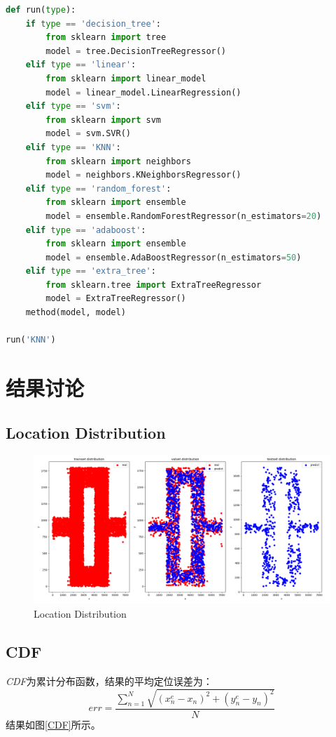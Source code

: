 \documentclass[UTF-8, a4paper, 10pt]{article}
\numberwithin{equation}{section}
\begin{document}
\begin{lstlisting}[language=python]
def run(type):
    if type == 'decision_tree':
        from sklearn import tree
        model = tree.DecisionTreeRegressor()
    elif type == 'linear':
        from sklearn import linear_model
        model = linear_model.LinearRegression()
    elif type == 'svm':
        from sklearn import svm
        model = svm.SVR()
    elif type == 'KNN':
        from sklearn import neighbors
        model = neighbors.KNeighborsRegressor()
    elif type == 'random_forest':
        from sklearn import ensemble
        model = ensemble.RandomForestRegressor(n_estimators=20)
    elif type == 'adaboost':
        from sklearn import ensemble
        model = ensemble.AdaBoostRegressor(n_estimators=50)
    elif type == 'extra_tree':
        from sklearn.tree import ExtraTreeRegressor
        model = ExtraTreeRegressor()
    method(model, model)

run('KNN')
\end{lstlisting}

\section{结果讨论}
\subsection{Location Distribution}
\begin{figure}[!htbp]
  \centering
  \includegraphics[width=15cm]{distribution.png}
  \caption{Location Distribution}
\end{figure}

\subsection{CDF}
\emph{CDF}为累计分布函数，结果的平均定位误差为：
\begin{equation}\label{ep:eqs}
  err = \frac{\sum_{n=1}^{N} \sqrt{(x_n^e - x_n)^2 + (y_n^e - y_n)^2}}{N}
\end{equation}
结果如图\ref{CDF}所示。
\end{document}
